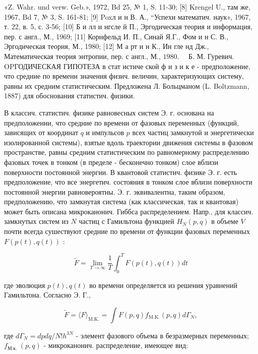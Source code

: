 \documentclass[10pt]{article}
\begin{document}
«Z. Wahr. und verw. Geb.», 1972, Bd 25, № 1, S. 11-30; [8] Krengel U., там же, 1967, Bd 7, № 3, S. 161-81; [9] Poxл и н В. А., “Успехи математич. наук», 1967, т. 22, в. 5, с. 3-56; [10] Б и лл и нгсле й П., Эргодическая теория и информация, пер. с англ., М., 1969; [11] Корнфельд И. П., Синай Я.Г., Фом и н С. В., Эргодическая теория, М., 1980; [12] М а рт и н К., Ин гле нд Дж., Математическая теория энтропии, пер. с англ., М., $1980 . \quad$ Б. М. Гуревич. OPГОДИЧЕСКАЯ ГИПОТЕЗА в стат истиче ской ф и з и к е - предположение, что средние по времени значения физич. величин, характеризующих систему, равны их средним статистическим. Предложена Л. Больцманом (L. Boltzmann, 1887) для обоснования статистич. физики.



В классич. статистич. физике равновесных систем Э. г. основана на предположении, что средние по времени от фазовых переменных (функций, зависящих от координат $q$ и импульсов $p$ всех частиц замкнутой и энергетически изолированной системы), взятые вдоль траектории движения системы в фазовом пространстве, равны средним статистическим по равномерному распределению фазовых точек в тонком (в пределе - бесконечно тонком) слое вблизи поверхности постоянной энергии. В квантовой статистич. физике Э. г. есть предположение, что все энергетич. состояния в тонком слое вблизи поверхности постоянной энергии равновероятны. Э. г. эквивалентна, таким образом, предположению, что замкнутая система (как классическая, так и квантовая) может быть описана микроканонич. Гиббса распределением. Напр., для классич. замкнутых систем из $N$ частиц с Гамильтона функцией $H_{N}(p, q)$ в объеме $V$ почти всегда сушествуют средние по времени от функции фазовых переменных $F(p(t), q(t))$ :



\[

\tilde{F}=\lim _{T \rightarrow \infty} \frac{1}{T} \int_{0}^{T} F(p(t), q(t)) d t

\]



где эволюция $p(t), q(t)$ во времени определяется из решения уравнений Гамильтона. Согласно Э. Г.,



\[

\tilde{F}=\langle F\rangle_{\mathrm{M} . \mathrm{K} .}=\int F(p, q) f_{\mathrm{M} . \mathrm{K} .}(p, q) d \Gamma_{N},

\]



где $d \Gamma_{N}=d p d q / N ! h^{3 N}$ - элемент фазового объема в безразмерных переменных; $f_{\text {М.к. }}(p, q)$ - микроканонич. распределение, имеющее вид:
\end{document}
